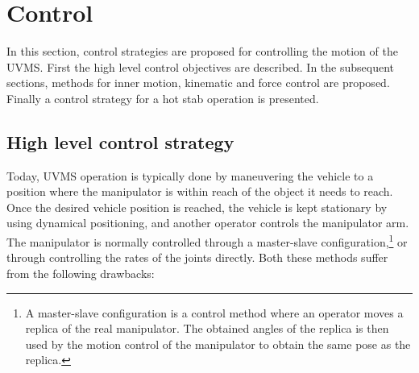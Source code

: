 
\section{Control}
\label{sec:control}
In this section, control strategies are proposed for controlling the motion of the UVMS. First the high level control objectives are described. In the subsequent sections, methods for inner motion, kinematic and force control are proposed. Finally a control strategy for a hot stab operation is presented.  

\subsection{High level control strategy}
Today, UVMS operation is typically done by maneuvering the vehicle to a position where the manipulator is within reach of the object it needs to reach. Once the desired vehicle position is reached, the vehicle is kept stationary by using dynamical positioning, and another operator controls the manipulator arm. The manipulator is normally controlled through a master-slave configuration,\footnote{A master-slave configuration is a control method where an operator moves a replica of the real manipulator. The obtained angles of the replica is then used by the motion control of the manipulator to obtain the same pose as the replica.} 
or through controlling the rates of the joints directly. Both these methods suffer from the following drawbacks:

